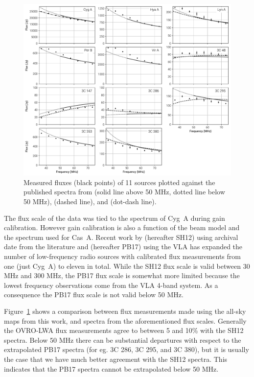 \documentclass[twocolumn]{aastex61}
\begin{document}
\begin{figure}[t]
    \includegraphics[width=\textwidth]{figures/flux-scale/flux-scale}
    \caption{
        Measured fluxes (black points) of 11 sources plotted against the published spectra from
        \citet{2017ApJS..230....7P} (solid line above 50 MHz, dotted line below 50 MHz),
        \citet{2012MNRAS.423L..30S} (dashed line), and \citet{1977A&A....61...99B} (dot-dash line).
    }
    \label{fig:flux-scale}
\end{figure}

The flux scale of the data was tied to the \citet{1977A&A....61...99B} spectrum of Cyg~A during gain
calibration. However gain calibration is also a function of the beam model and the spectrum used for
Cas~A. Recent work by \citet{2012MNRAS.423L..30S} (hereafter SH12) using archival date from the
literature and \citet{2017ApJS..230....7P} (hereafter PB17) using the VLA has expanded the number of
low-frequency radio sources with calibrated flux measurements from one (just Cyg~A) to eleven in
total. While the SH12 flux scale is valid between 30 MHz and 300 MHz, the PB17 flux scale is
somewhat more limited because the lowest frequency observations come from the VLA 4-band system. As
a consequence the PB17 flux scale is not valid below 50 MHz.

Figure~\ref{fig:flux-scale} shows a comparison between flux measurements made using the all-sky maps
from this work, and spectra from the aforementioned flux scales. Generally the OVRO-LWA flux
measurements agree to between 5 and 10\% with the SH12 spectra. Below 50 MHz there can be
substantial departures with respect to the extrapolated PB17 spectra (for eg.  3C 286, 3C 295, and
3C 380), but it is usually the case that we have much better agreement with the SH12 spectra. This
indicates that the PB17 spectra cannot be extrapolated below 50 MHz.
\end{document}
